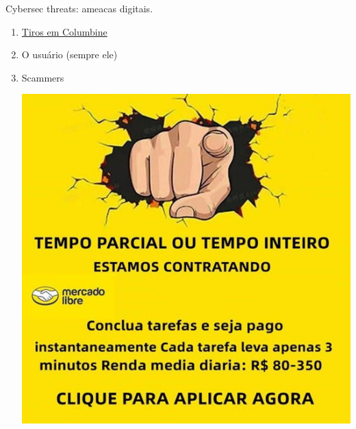 {\LARGE Cybersec threats: ameacas digitais.}
\begin{enumerate}
	\item \href{https://pt.wikipedia.org/wiki/Massacre_de_Columbine}{Tiros em Columbine}
	\item O usuário (sempre ele)
	\item Scammers
	
	\includegraphics[width=\linewidth]{./IMG/scam.png}
	

\end{enumerate}
